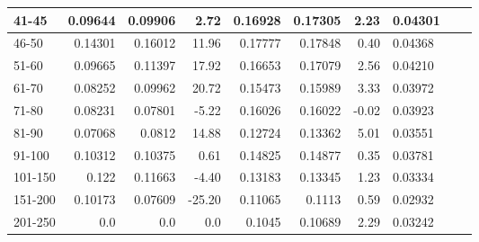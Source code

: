 \begin{table}[]
\begin{tabular}{|l|r|r|r||r|r|r||l|l|l|}
        41-45     & 0.09644                                 & 0.09906                       & 2.72                             & 0.16928                    & 0.17305                  & 2.23                       & 0.04301 &     &      \\ \hline
        46-50     & 0.14301                                 & 0.16012                       & 11.96                            & 0.17777                    & 0.17848                  & 0.40                       & 0.04368 &     &      \\ \hline
        51-60     & 0.09665                                 & 0.11397                       & 17.92                            & 0.16653                    & 0.17079                  & 2.56                       & 0.04210 &     &      \\ \hline
        61-70     & 0.08252                                 & 0.09962                       & 20.72                            & 0.15473                    & 0.15989                  & 3.33                       & 0.03972 &     &      \\ \hline
        71-80     & 0.08231                                 & 0.07801                       & -5.22                            & 0.16026                    & 0.16022                  & -0.02                      & 0.03923 &     &      \\ \hline
        81-90     & 0.07068                                 & 0.0812                        & 14.88                            & 0.12724                    & 0.13362                  & 5.01                       & 0.03551 &     &      \\ \hline
        91-100    & 0.10312                                 & 0.10375                       & 0.61                             & 0.14825                    & 0.14877                  & 0.35                       & 0.03781 &     &      \\ \hline
        101-150   & 0.122                                   & 0.11663                       & -4.40                            & 0.13183                    & 0.13345                  & 1.23                       & 0.03334 &     &      \\ \hline
        151-200   & 0.10173                                 & 0.07609                       & -25.20                           & 0.11065                    & 0.1113                   & 0.59                       & 0.02932 &     &      \\ \hline
        201-250   & 0.0                                     & 0.0                           & 0.0                              & 0.1045                     & 0.10689                  & 2.29                       & 0.03242 &     &      \\ \hline

\end{tabular}
\end{table}

